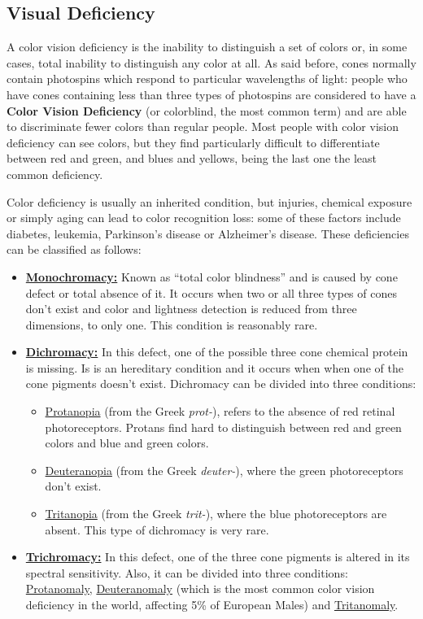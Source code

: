 \documentclass{report}
\begin{document}
\subsection{Visual Deficiency}
A color vision deficiency is the inability to distinguish a set of colors or, in some cases, total
inability to distinguish any color at all. As said before, cones normally contain photospins which respond
to particular wavelengths of light: people who have cones containing less than three types of photospins are considered to have a \textbf{Color Vision Deficiency} (or colorblind, the most common term)
and are able to discriminate fewer colors than regular people. Most people with color vision deficiency can
see colors, but they find particularly difficult to differentiate between red and green, and blues and
yellows, being the last one the least common deficiency. \par 
Color deficiency is usually an inherited condition, but injuries, chemical exposure or simply aging can lead to color
recognition loss: some of these factors include diabetes, leukemia, Parkinson’s disease or Alzheimer’s
disease. These deficiencies can be classified as follows:
%
\begin{itemize}
\item \textbf{\underline{Monochromacy:}} Known as “total color blindness” and is caused by cone defect or
total absence of it. It occurs when two or all three types of cones don’t exist and color and lightness
detection is reduced from three dimensions, to only one. This condition is reasonably rare.
\item \textbf{\underline{Dichromacy:}} In this defect, one of the possible three cone chemical protein is
missing. Is is an hereditary condition and it occurs when when one of the cone pigments doesn’t exist.
Dichromacy can be divided into three conditions: 
	\begin{itemize}
	\item \underline{Protanopia} (from the Greek \emph{prot-}), refers to the absence of red retinal
    photoreceptors.
    Protans find hard to distinguish between red and green colors and blue and green colors.
    \item \underline{Deuteranopia} (from the Greek \emph{deuter-}), where the green photoreceptors don’t
    exist. 
    \item \underline{Tritanopia} (from the Greek \emph{trit-}), where the blue photoreceptors are absent.
    This type of dichromacy is very rare.
	\end{itemize}
\item \textbf{\underline{Trichromacy:}} In this defect, one of the three cone pigments is altered in its
spectral sensitivity. Also, it can be divided into three conditions: \underline{Protanomaly}, \underline{Deuteranomaly} (which is the most common color vision deficiency in the world, affecting 5\% of European Males) and \underline{Tritanomaly}.
\end{itemize} \par
\end{document}
